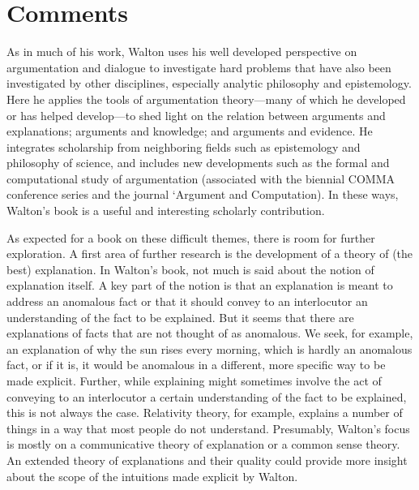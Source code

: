\documentclass[12pt]{article}
\begin{document}
\section{Comments}
\label{comments}

\noindent As in much of his work, Walton uses his well developed perspective on argumentation and dialogue to investigate hard problems 
that have also been investigated by other disciplines, especially analytic philosophy and epistemology. 
Here he applies the tools of argumentation theory---many of which he developed or has helped develop---to shed light on 
the relation between arguments and explanations; arguments and knowledge;
and arguments and evidence. 
He integrates scholarship from neighboring fields such as epistemology and philosophy of science, and includes 
new developments such as the formal and computational study of argumentation (associated with the biennial COMMA conference series and the journal `Argument and Computation). In these ways, Walton's book is a useful and interesting scholarly contribution.

As expected for a book on these difficult themes, there is room for further exploration. A first area of further research is the development of a theory of (the
best) explanation. In Walton's book, not much is said about the notion of
explanation itself. A key part of the notion is that an
explanation is meant to address an anomalous fact or that it should
convey to an interlocutor an understanding of the fact to be
explained. But it seems that there are explanations of facts that are not thought of as anomalous. We seek, for example, an
explanation of why the sun rises every morning, which is hardly an
anomalous fact, or if it is, it would be
anomalous in a different, more specific way to be made explicit. Further, while explaining might sometimes
involve the act of conveying to an interlocutor a certain
understanding of the fact to be explained, this is not always the
case. Relativity theory, for example, explains a number of things in a
way that most people do not understand. Presumably, Walton's focus is mostly on a
communicative theory of explanation or a common sense theory. An extended theory of explanations and their quality could provide more insight about the scope of the
intuitions made explicit by Walton.
\end{document}

